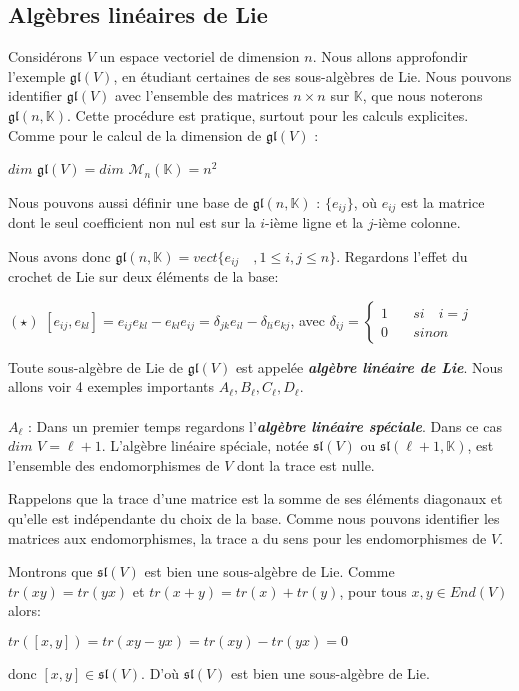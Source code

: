 \documentclass[a4paper,openany,12pt]{report}
\newcommand{\KK}{\mathbb{K}}
\newcommand{\MM}{\mathcal{M}}
\newcommand{\gl}{\mathfrak{gl}}
\newcommand{\ssl}{\mathfrak{sl}}
\theoremstyle{break}
{\theorembodyfont{\upshape}
\newtheorem*{rmq}{Remarque :}
\newtheorem*{prv}{Preuve :}
\newtheorem*{ex}{Exemples :}
\newtheorem*{exe}{Exemple : }
\newtheorem*{nota}{Notation :}
\newtheorem*{dem}{D\'emonstration :}}
\begin{document}
\subsection{Algèbres linéaires de Lie}\label{b}

Considérons $V$ un espace vectoriel de dimension $n$. Nous allons approfondir l'exemple $\gl(V)$, en étudiant certaines de ses sous-algèbres de Lie. Nous pouvons identifier $\gl(V)$  avec l'ensemble des matrices $n \times n$ sur $\KK$, que nous noterons $\gl(n,\KK)$. Cette procédure est pratique, surtout pour les calculs explicites. Comme pour le calcul de la dimension de $\gl(V)$ :
\begin{center}
$dim$ $\gl(V)= dim$ $\MM_{n}(\KK) = n^{2}$
\end{center}

Nous pouvons aussi définir une base de $\gl(n,\KK)$ : $ \{ e_{ij} \}$, où $e_{ij}$ est la matrice dont le seul coefficient non nul est sur la $i$-ième ligne et la $j$-ième colonne.
 
Nous avons donc $\gl(n,\KK)=vect\{ { e_{ij} \quad , 1\leq i , j \leq n }\}$. Regardons l'effet du crochet de Lie sur deux éléments de la base:
\begin{center}
$(\star)$ \quad $ [ e_{ij},e_{kl} ] = e_{ij} e_{kl} - e_{kl} e_{ij}  = \delta_{jk}e_{il}  -  \delta_{li}e_{kj} $, avec 
$ \delta_{ij} = \left \{
\begin{aligned}
1 & \quad si \quad i=j\\
0 & \quad sinon
\end{aligned}
\right. $
\end{center}

Toute sous-algèbre de Lie de $\gl(V)$ est appelée \emph{\textbf{algèbre linéaire de Lie}}. Nous allons voir 4 exemples importants  $A_{\ell}, B_{\ell}, C_{\ell}, D_{\ell}$.\\
\\
$ A_{\ell} $ : Dans un premier temps regardons l'\emph{\textbf{algèbre linéaire spéciale}}. Dans ce cas $dim$ $V= \ell +1$. L'algèbre linéaire spéciale, notée $\ssl(V)$ ou $\ssl(\ell+1,\KK)$, est l'ensemble des endomorphismes de $V$ dont la trace est nulle.

Rappelons que la trace d'une matrice est la somme de ses éléments diagonaux et qu'elle est indépendante du choix de la base. Comme nous pouvons identifier les matrices aux endomorphismes, la trace a du sens pour les endomorphismes de $V$.

Montrons que $\ssl(V)$ est bien une sous-algèbre de Lie. Comme $tr(xy)=tr(yx)$ et $tr(x+y)= tr(x) + tr(y)$,  pour tous $x,y  \in End(V)$ alors:
\begin{center}
$tr([x,y])=tr(xy-yx)=tr(xy)-tr(yx)=0$
\end{center} 
donc $[x,y] \in \ssl(V)$. D'où $\ssl(V)$ est bien une sous-algèbre de Lie.
\end{document}
